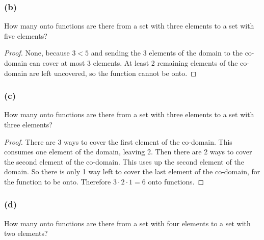 \documentclass[14pt]{extarticle}
\begin{document}
\subsubsection{(b)}
How many onto functions are there from a set with three elements to a set with five elements?

\begin{proof}
None, because \(3 < 5\) and sending the 3 elements of the domain to the co-domain can cover at most 3 elements. At least 
2 remaining elements of the co-domain are left uncovered, so the function cannot be onto.
\end{proof}

\subsubsection{(c)}
How many onto functions are there from a set with three elements to a set with three elements?

\begin{proof}
There are 3 ways to cover the first element of the co-domain. This consumes one element of the domain, leaving 2. Then there 
are 2 ways to cover the second element of the co-domain. This uses up the second element of the domain. So there is only 1
way left to cover the last element of the co-domain, for the function to be onto. Therefore \(3 \cdot 2 \cdot 1 = 6\) onto
functions.
\end{proof}

\subsubsection{(d)}
How many onto functions are there from a set with four elements to a set with two elements?
\end{document}
